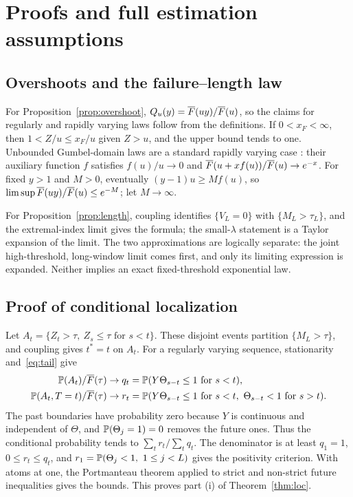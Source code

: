 \section{Proofs and full estimation assumptions}\label{app:proofs}

\subsection{Overshoots and the failure--length law}

For Proposition~\ref{prop:overshoot}, $Q_u(y)=\overline{F}(uy)/\overline{F}(u)$, so the claims for regularly and rapidly varying laws follow from the definitions. If $0<x_F<\infty$, then $1<Z/u\le x_F/u$ given $Z>u$, and the upper bound tends to one. Unbounded Gumbel-domain laws are a standard rapidly varying case \citep{dehaan2006,resnick1987}: their auxiliary function $f$ satisfies $f(u)/u\to0$ and $\overline{F}(u+xf(u))/\overline{F}(u)\to e^{-x}$. For fixed $y>1$ and $M>0$, eventually $(y-1)u\ge Mf(u)$, so $\limsup\overline{F}(uy)/\overline{F}(u)\le e^{-M}$; let $M\to\infty$.

For Proposition~\ref{prop:length}, coupling identifies $\{V_L=0\}$ with $\{M_L>\tau_L\}$, and the extremal-index limit gives the formula; the small-$\lambda$ statement is a Taylor expansion of the limit. The two approximations are logically separate: the joint high-threshold, long-window limit comes first, and only its limiting expression is expanded. Neither implies an exact fixed-threshold exponential law.

\subsection{Proof of conditional localization}

Let $A_t=\{Z_t>\tau,\ Z_s\le\tau\text{ for }s<t\}$. These disjoint events partition $\{M_L>\tau\}$, and coupling gives $t^*=t$ on $A_t$. For a regularly varying sequence, stationarity and~\eqref{eq:tail} give
\begin{align}
\mathbb{P}(A_t)/\overline{F}(\tau)&\to q_t=\mathbb{P}(Y\Theta_{s-t}\le1\text{ for }s<t),\label{eq:qt}\\
\mathbb{P}(A_t,T=t)/\overline{F}(\tau)&\to r_t=\mathbb{P}(Y\Theta_{s-t}\le1\text{ for }s<t,\ \Theta_{s-t}<1\text{ for }s>t).\label{eq:rt}
\end{align}
The past boundaries have probability zero because $Y$ is continuous and independent of $\Theta$, and $\mathbb{P}(\Theta_j=1)=0$ removes the future ones. Thus the conditional probability tends to $\sum_tr_t/\sum_tq_t$. The denominator is at least $q_1=1$, $0\le r_t\le q_t$, and $r_1=\mathbb{P}(\Theta_j<1,\ 1\le j<L)$ gives the positivity criterion. With atoms at one, the Portmanteau theorem applied to strict and non-strict future inequalities gives the bounds. This proves part (i) of Theorem~\ref{thm:loc}.

